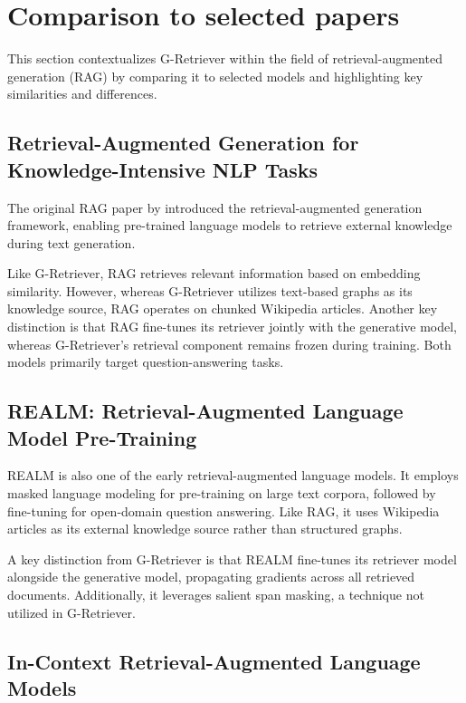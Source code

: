 \section{Comparison to selected papers}

This section contextualizes G-Retriever within the field of retrieval-augmented generation (RAG) by comparing it to selected models and highlighting key similarities and differences.

\subsection{Retrieval-Augmented Generation for    Knowledge-Intensive NLP Tasks}

The original RAG paper by \citet{rag} introduced the retrieval-augmented generation framework, enabling pre-trained language models to retrieve external knowledge during text generation.

Like G-Retriever, RAG retrieves relevant information based on embedding similarity.
However, whereas G-Retriever utilizes text-based graphs as its knowledge source, RAG operates on chunked Wikipedia articles.
Another key distinction is that RAG fine-tunes its retriever jointly with the generative model, whereas G-Retriever's retrieval component remains frozen during training.
Both models primarily target question-answering tasks.

\subsection{REALM: Retrieval-Augmented Language Model Pre-Training}

REALM \cite{realm} is also one of the early retrieval-augmented language models.
It employs masked language modeling for pre-training on large text corpora, followed by fine-tuning for open-domain question answering.
Like RAG, it uses Wikipedia articles as its external knowledge source rather than structured graphs.

A key distinction from G-Retriever is that REALM fine-tunes its retriever model alongside the generative model, propagating gradients across all retrieved documents.
Additionally, it leverages salient span masking, a technique not utilized in G-Retriever.

\subsection{In-Context Retrieval-Augmented Language Models}


